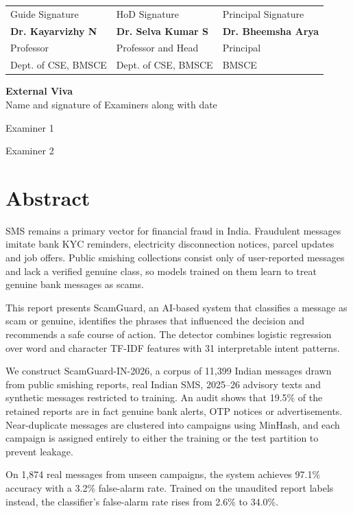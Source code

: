 \vspace{2.2cm}
\noindent
\begin{tabular}{@{}L{4.3cm}L{5.6cm}L{4.0cm}@{}}
Guide Signature & HoD Signature & Principal Signature\\[1.2cm]
\textbf{Dr. Kayarvizhy N} & \textbf{Dr. Selva Kumar S} & \textbf{Dr. Bheemsha Arya}\\
Professor & Professor and Head & Principal\\
Dept. of CSE, BMSCE & Dept. of CSE, BMSCE & BMSCE
\end{tabular}

\vspace{1.6cm}
\noindent\textbf{External Viva}\\
Name and signature of Examiners along with date

\vspace{1.5cm}
\noindent Examiner 1

\vspace{1.5cm}
\noindent Examiner 2
\clearpage

\chapter*{\centering Abstract}
SMS remains a primary vector for financial fraud in India. Fraudulent messages imitate bank KYC reminders, electricity disconnection notices, parcel updates and job offers. Public smishing collections consist only of user-reported messages and lack a verified genuine class, so models trained on them learn to treat genuine bank messages as scams.

This report presents ScamGuard, an AI-based system that classifies a message as scam or genuine, identifies the phrases that influenced the decision and recommends a safe course of action. The detector combines logistic regression over word and character TF-IDF features with 31 interpretable intent patterns.

We construct ScamGuard-IN-2026, a corpus of 11,399 Indian messages drawn from public smishing reports, real Indian SMS, 2025--26 advisory texts and synthetic messages restricted to training. An audit shows that 19.5\% of the retained reports are in fact genuine bank alerts, OTP notices or advertisements. Near-duplicate messages are clustered into campaigns using MinHash, and each campaign is assigned entirely to either the training or the test partition to prevent leakage.

On 1,874 real messages from unseen campaigns, the system achieves 97.1\% accuracy with a 3.2\% false-alarm rate. Trained on the unaudited report labels instead, the classifier's false-alarm rate rises from 2.6\% to 34.0\%.

